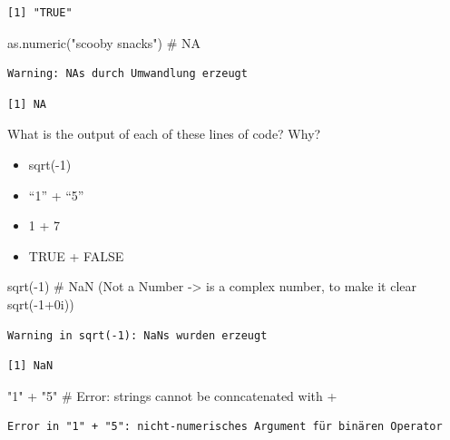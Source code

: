 \documentclass[
  letterpaper,
  DIV=11,
  numbers=noendperiod]{scrartcl}
\newenvironment{Shaded}{\begin{snugshade}}{\end{snugshade}}
\newcommand{\CommentTok}[1]{\textcolor[rgb]{0.37,0.37,0.37}{#1}}
\newcommand{\DecValTok}[1]{\textcolor[rgb]{0.68,0.00,0.00}{#1}}
\newcommand{\FunctionTok}[1]{\textcolor[rgb]{0.28,0.35,0.67}{#1}}
\newcommand{\NormalTok}[1]{\textcolor[rgb]{0.00,0.23,0.31}{#1}}
\newcommand{\SpecialCharTok}[1]{\textcolor[rgb]{0.37,0.37,0.37}{#1}}
\newcommand{\StringTok}[1]{\textcolor[rgb]{0.13,0.47,0.30}{#1}}
\begin{document}
\begin{verbatim}
[1] "TRUE"
\end{verbatim}

\begin{Shaded}
\begin{Highlighting}[]
\FunctionTok{as.numeric}\NormalTok{(}\StringTok{"scooby snacks"}\NormalTok{) }\CommentTok{\# NA}
\end{Highlighting}
\end{Shaded}

\begin{verbatim}
Warning: NAs durch Umwandlung erzeugt
\end{verbatim}

\begin{verbatim}
[1] NA
\end{verbatim}

What is the output of each of these lines of code? Why?

\begin{itemize}
\item
  sqrt(-1)
\item
  ``1'' + ``5''
\item
  1 + 7
\item
  TRUE + FALSE
\end{itemize}

\begin{Shaded}
\begin{Highlighting}[]
\FunctionTok{sqrt}\NormalTok{(}\SpecialCharTok{{-}}\DecValTok{1}\NormalTok{) }\CommentTok{\# NaN (Not a Number {-}\textgreater{} is a complex number, to make it clear sqrt({-}1+0i))}
\end{Highlighting}
\end{Shaded}

\begin{verbatim}
Warning in sqrt(-1): NaNs wurden erzeugt
\end{verbatim}

\begin{verbatim}
[1] NaN
\end{verbatim}

\begin{Shaded}
\begin{Highlighting}[]
\StringTok{"1"} \SpecialCharTok{+} \StringTok{"5"} \CommentTok{\# Error: strings cannot be conncatenated with +}
\end{Highlighting}
\end{Shaded}

\begin{verbatim}
Error in "1" + "5": nicht-numerisches Argument für binären Operator
\end{verbatim}
\end{document}
